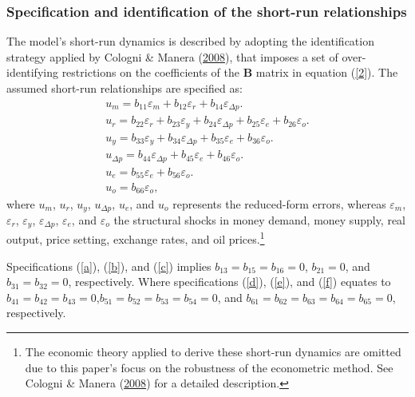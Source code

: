 \documentclass[11pt,preprint, authoryear]{elsarticle}
\numberwithin{equation}{section}
\numberwithin{figure}{section}
\numberwithin{table}{section}
\let\rmarkdownfootnote\footnote%
\def\footnote{\protect\rmarkdownfootnote}
\begin{document}
\hypertarget{specification-and-identification-of-the-short-run-relationships}{%
\subsubsection{\texorpdfstring{Specification and identification of the
short-run relationships
\label{srr}}{Specification and identification of the short-run relationships }}\label{specification-and-identification-of-the-short-run-relationships}}

The model's short-run dynamics is described by adopting the
identification strategy applied by Cologni \& Manera
(\protect\hyperlink{ref-cologni2008}{2008}), that imposes a set of
over-identifying restrictions on the coefficients of the \(\bm{B}\)
matrix in equation (\ref{2}). The assumed short-run relationships are
specified as: \begin{align}
u_m = b_{11} \varepsilon_m + b_{12} \varepsilon_r + b_{14} \varepsilon_{\Delta p}. \label{a} \\ 
u_r= b_{22} \varepsilon_r+ b_{23} \varepsilon_y + b_{24}\varepsilon_{\Delta p} + b_{25 }\varepsilon_e  + b_{26} \varepsilon_o. \label{b} \\ 
u_y= b_{33} \varepsilon_y  + b_{34} \varepsilon_{\Delta p} +  b_{35} \varepsilon_e + b_{36}\varepsilon_o. \label{c} \\
u_{\Delta p}= b_{44} \varepsilon_{\Delta p} + b_{45}\varepsilon_e + b_{46} \varepsilon_o. \label{d} \\ 
u_e=b_{55} \varepsilon_e + b_{56 }\varepsilon_o. \label{e} \\ 
u_o=  b_{66}\varepsilon_o, \label{f}
\end{align} where \(u_m\), \(u_r\), \(u_y\), \(u_{\Delta p}\), \(u_e\),
and \(u_o\) represents the reduced-form errors, whereas
\(\varepsilon_m\), \(\varepsilon_r\), \(\varepsilon_y\),
\(\varepsilon_{\Delta p}\), \(\varepsilon_e\), and \(\varepsilon_o\) the
structural shocks in money demand, money supply, real output, price
setting, exchange rates, and oil prices.\footnote{The economic theory
  applied to derive these short-run dynamics are omitted due to this
  paper's focus on the robustness of the econometric method. See Cologni
  \& Manera (\protect\hyperlink{ref-cologni2008}{2008}) for a detailed
  description.}

Specifications (\ref{a}), (\ref{b}), and (\ref{c}) implies
\(b_{13}=b_{15}=b_{16}=0\), \(b_{21}=0\), and \(b_{31}=b_{32}=0\),
respectively. Where specifications (\ref{d}), (\ref{e}), and (\ref{f})
equates to \(b_{41}=b_{42}=b_{43}=0\),\(b_{51}=b_{52}=b_{53}=b_{54}=0\),
and \(b_{61}=b_{62}=b_{63}=b_{64}=b_{65}=0\), respectively.
\end{document}
